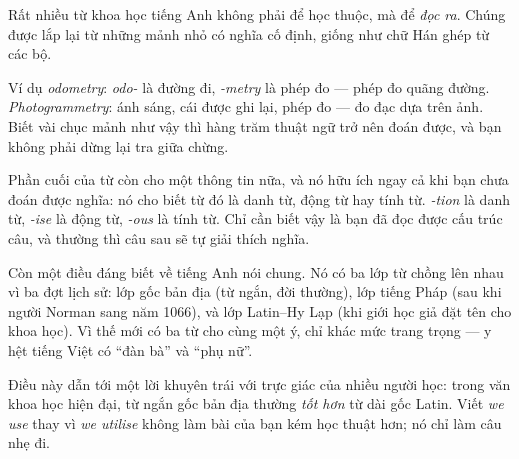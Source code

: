 \documentclass[../../english.tex]{subfiles}
\begin{document}
\begin{dongian}
Rất nhiều từ khoa học tiếng Anh không phải để học thuộc, mà để \emph{đọc ra}. Chúng được lắp lại từ những mảnh nhỏ có nghĩa cố định, giống như chữ Hán ghép từ các bộ.

Ví dụ \emph{odometry}: \emph{odo-} là đường đi, \emph{-metry} là phép đo --- phép đo quãng đường. \emph{Photogrammetry}: ánh sáng, cái được ghi lại, phép đo --- đo đạc dựa trên ảnh. Biết vài chục mảnh như vậy thì hàng trăm thuật ngữ trở nên đoán được, và bạn không phải dừng lại tra giữa chừng.

Phần cuối của từ còn cho một thông tin nữa, và nó hữu ích ngay cả khi bạn chưa đoán được nghĩa: nó cho biết từ đó là danh từ, động từ hay tính từ. \emph{-tion} là danh từ, \emph{-ise} là động từ, \emph{-ous} là tính từ. Chỉ cần biết vậy là bạn đã đọc được cấu trúc câu, và thường thì câu sau sẽ tự giải thích nghĩa.

Còn một điều đáng biết về tiếng Anh nói chung. Nó có ba lớp từ chồng lên nhau vì ba đợt lịch sử: lớp gốc bản địa (từ ngắn, đời thường), lớp tiếng Pháp (sau khi người Norman sang năm 1066), và lớp Latin--Hy Lạp (khi giới học giả đặt tên cho khoa học). Vì thế mới có ba từ cho cùng một ý, chỉ khác mức trang trọng --- y hệt tiếng Việt có ``đàn bà'' và ``phụ nữ''.

Điều này dẫn tới một lời khuyên trái với trực giác của nhiều người học: trong văn khoa học hiện đại, từ ngắn gốc bản địa thường \emph{tốt hơn} từ dài gốc Latin. Viết \emph{we use} thay vì \emph{we utilise} không làm bài của bạn kém học thuật hơn; nó chỉ làm câu nhẹ đi.
\end{dongian}
\end{document}
